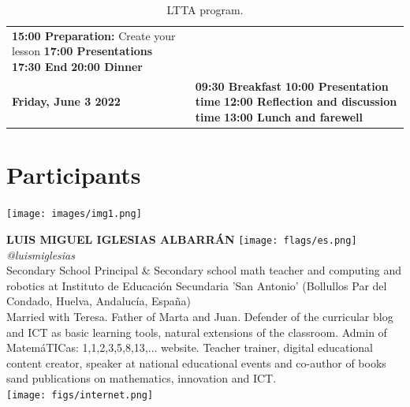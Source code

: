 \documentclass[11pt]{article}
\begin{document}
\begin{table}
\begin{center}
\begin{tabular}{m{6cm} m{8cm}}
        \textbf{15:00 Preparation:} Create your lesson
        \newline
        \textbf{17:00 Presentations} \newline
        \textbf{17:30 End} \newline
        \textbf{20:00 Dinner} \\
        \rowcolor{gray!15}
        \centering\textbf{Friday, June 3 2022} &
        \textbf{09:30 Breakfast} \newline 
        \textbf{10:00 Presentation time} \newline 
        \textbf{12:00 Reflection and discussion time} \newline 
        \textbf{13:00 Lunch and farewell} \\
        \bottomrule%
    \end{tabular}
      \caption[LTTA program]{LTTA program.}
      \label{tab:program}
     \end{center}
    \end{table}

    \newpage

\section*{Participants}
\noindent
\begin{minipage}{0.3\textwidth}
\centering
\texttt{[image: images/img1.png]}
\end{minipage}
\hfill
\begin{minipage}{0.6\textwidth}\raggedright
\color{color1}\uppercase{\textbf{Luis Miguel Iglesias Albarrán}}
\color{color2}\hspace{0.2cm}\texttt{[image: flags/es.png]}
\hspace{0.2cm}\textit{@luismiglesias}
\\
Secondary School Principal \& Secondary school math teacher and computing and robotics at Instituto de Educación Secundaria 'San Antonio' (Bollullos Par del Condado, Huelva, Andalucía, España)\\
{\footnotesize Married with Teresa. Father of Marta and Juan. Defender of the curricular blog and ICT as basic learning tools, natural extensions of the classroom. Admin of MatemáTICas: 1,1,2,3,5,8,13,... website. Teacher trainer, digital educational content creator, speaker at national educational events and co-author of books sand publications on mathematics, innovation and ICT.}\\
\texttt{[image: figs/internet.png]}
\end{minipage}
\newline\newline\newline
\end{document}
